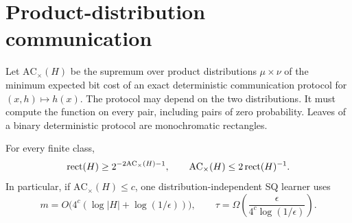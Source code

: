 \section{Product-distribution communication}\label{sec:communication}
Let $\mathrm{AC}_{\times}(H)$ be the supremum over product distributions $\mu\times\nu$ of the minimum expected bit cost of an exact deterministic communication protocol for $(x,h)\mapsto h(x)$. The protocol may depend on the two distributions. It must compute the function on every pair, including pairs of zero probability. Leaves of a binary deterministic protocol are monochromatic rectangles.

\begin{samepage}
\begin{theorem}\label{thm:communication}
For every finite class,
\[
 \operatorname{rect}(H)\ge2^{-2\mathrm{AC}_{\times}(H)-1},
 \qquad
 \mathrm{AC}_{\times}(H)\le2\operatorname{rect}(H)^{-1}.
\]
In particular, if $\mathrm{AC}_{\times}(H)\le c$, one distribution-independent SQ learner uses
\[
 m=O\bigl(4^c(\log|H|+\log(1/\epsilon))\bigr),\qquad
 \tau=\Omega\!\left(\frac{\epsilon}{4^c\log(1/\epsilon)}\right).
\]
\end{theorem}
\end{samepage}
